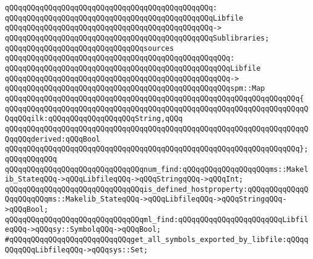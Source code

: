 \verb|qQQqqQQqqQQqqQQqqQQqqQQqqQQqqQQqqQQqqQQqqQQqqQQq:|\newline
\verb|qQQqqQQqqQQqqQQqqQQqqQQqqQQqqQQqqQQqqQQqqQQqqQQqLibfile|\newline
\verb|qQQqqQQqqQQqqQQqqQQqqQQqqQQqqQQqqQQqqQQqqQQqqQQq->|\newline
\verb|qQQqqQQqqQQqqQQqqQQqqQQqqQQqqQQqqQQqqQQqqQQqqQQqSublibraries;|\newline
\newline
\newline
\verb|qQQqqQQqqQQqqQQqqQQqqQQqqQQqqQQqsources|\newline
\verb|qQQqqQQqqQQqqQQqqQQqqQQqqQQqqQQqqQQqqQQqqQQqqQQqqQQq:|\newline
\verb|qQQqqQQqqQQqqQQqqQQqqQQqqQQqqQQqqQQqqQQqqQQqqQQqqQQqLibfile|\newline
\verb|qQQqqQQqqQQqqQQqqQQqqQQqqQQqqQQqqQQqqQQqqQQqqQQqqQQq->|\newline
\verb|qQQqqQQqqQQqqQQqqQQqqQQqqQQqqQQqqQQqqQQqqQQqqQQqqQQqspm::Map|\newline
\verb|qQQqqQQqqQQqqQQqqQQqqQQqqQQqqQQqqQQqqQQqqQQqqQQqqQQqqQQqqQQqqQQqqQQq{|\newline
\verb|qQQqqQQqqQQqqQQqqQQqqQQqqQQqqQQqqQQqqQQqqQQqqQQqqQQqqQQqqQQqqQQqqQQqqQQqqQQqilk:qQQqqQQqqQQqqQQqqQQqString,qQQq|\newline
\verb|qQQqqQQqqQQqqQQqqQQqqQQqqQQqqQQqqQQqqQQqqQQqqQQqqQQqqQQqqQQqqQQqqQQqqQQqqQQqderived:qQQqBool|\newline
\verb|qQQqqQQqqQQqqQQqqQQqqQQqqQQqqQQqqQQqqQQqqQQqqQQqqQQqqQQqqQQqqQQqqQQq};qQQqqQQqqQQq|\newline
\newline
\verb|qQQqqQQqqQQqqQQqqQQqqQQqqQQqqQQqnum_find:qQQqqQQqqQQqqQQqqQQqms::Makelib_StateqQQq->qQQqLibfileqQQq->qQQqStringqQQq->qQQqInt;|\newline
\newline
\verb|qQQqqQQqqQQqqQQqqQQqqQQqqQQqqQQqis_defined_hostproperty:qQQqqQQqqQQqqQQqqQQqqQQqms::Makelib_StateqQQq->qQQqLibfileqQQq->qQQqStringqQQq->qQQqBool;|\newline
\newline
\verb|qQQqqQQqqQQqqQQqqQQqqQQqqQQqqQQqml_find:qQQqqQQqqQQqqQQqqQQqqQQqLibfileqQQq->qQQqsy::SymbolqQQq->qQQqBool;|\newline
\newline
\verb|#qQQqqQQqqQQqqQQqqQQqqQQqqQQqget_all_symbols_exported_by_libfile:qQQqqQQqqQQqLibfileqQQq->qQQqsys::Set;|\newline
\newline
